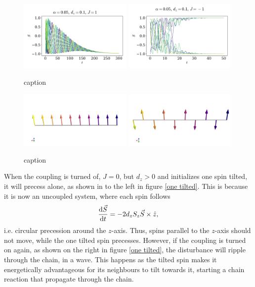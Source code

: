 \documentclass{article}
\begin{document}
    \begin{figure}
        \centering
        \includegraphics[width=0.49\textwidth]{../plots/ground_state_f.pdf}
        \includegraphics[width=0.49\textwidth]{../plots/ground_state_af.pdf}
        \caption{caption}
        \label{ground states}
    \end{figure}
    \begin{figure}
        \centering
        \includegraphics[width=0.49\textwidth]{../plots/ground_state_f3D.png}
        \includegraphics[width=0.49\textwidth]{../plots/ground_state_af3D.png}
        \caption{caption}
        \label{ground states 3D}
    \end{figure}

    When the coupling is turned of, $J = 0$, but $d_z>0$ and initializes one spin tilted, it will precess alone, as shown in to the left in figure \ref{one tilted}. This is because it is now an uncoupled system, where each spin follows 
    \begin{equation*}
        \dv{\vec S}{t} = - 2 d_z S_z \vec S \times \hat z, 
    \end{equation*}
    i.e. circular precession around the $z$-axis. Thus, spins parallel to the $z$-axis should not move, while the one tilted spin precesses. However, if the coupling is turned on again, as shown on the right in figure \ref{one tilted}, the disturbance will ripple through the chain, in a wave. This happens as the tilted spin makes it energetically advantageous for its neighbours to tilt towards it, starting a chain reaction that propagate through the chain. 
\end{document}
